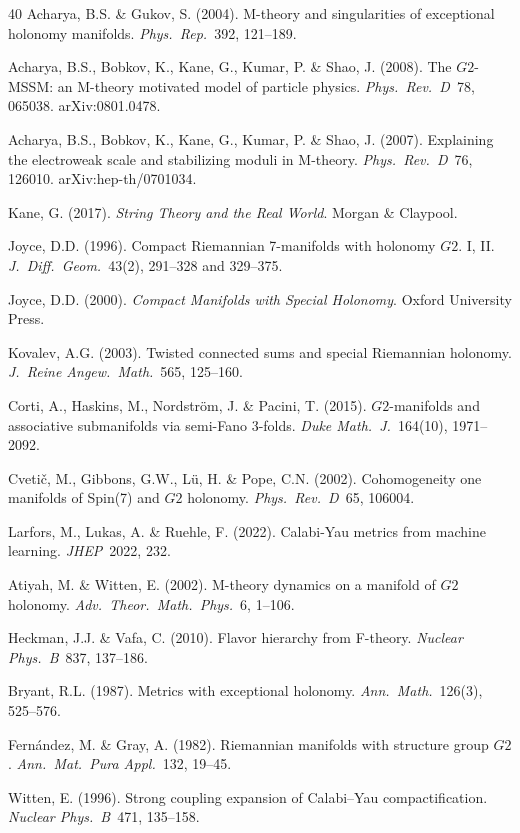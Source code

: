 \documentclass[11pt,a4paper]{article}
\newcommand{\Gtwo}{\mathrm{G}_2}
\theoremstyle{remark}
\def\Gtwo{G2}%
\begin{document}
\begin{thebibliography}{40}
Acharya, B.S. \& Gukov, S. (2004).
M-theory and singularities of exceptional holonomy manifolds.
\textit{Phys.\ Rep.}\ 392, 121--189.

Acharya, B.S., Bobkov, K., Kane, G., Kumar, P. \& Shao, J. (2008).
The $\Gtwo$-MSSM: an M-theory motivated model of particle physics.
\textit{Phys.\ Rev.\ D}\ 78, 065038. arXiv:0801.0478.

Acharya, B.S., Bobkov, K., Kane, G., Kumar, P. \& Shao, J. (2007).
Explaining the electroweak scale and stabilizing moduli in M-theory.
\textit{Phys.\ Rev.\ D}\ 76, 126010. arXiv:hep-th/0701034.

Kane, G. (2017).
\textit{String Theory and the Real World}.
Morgan \& Claypool.

Joyce, D.D. (1996).
Compact Riemannian 7-manifolds with holonomy $\Gtwo$. I, II.
\textit{J.\ Diff.\ Geom.}\ 43(2), 291--328 and 329--375.

Joyce, D.D. (2000).
\textit{Compact Manifolds with Special Holonomy}.
Oxford University Press.

Kovalev, A.G. (2003).
Twisted connected sums and special Riemannian holonomy.
\textit{J.\ Reine Angew.\ Math.}\ 565, 125--160.

Corti, A., Haskins, M., Nordstr\"om, J. \& Pacini, T. (2015).
$\Gtwo$-manifolds and associative submanifolds via semi-Fano 3-folds.
\textit{Duke Math.\ J.}\ 164(10), 1971--2092.

Cveti\v{c}, M., Gibbons, G.W., L\"u, H. \& Pope, C.N. (2002).
Cohomogeneity one manifolds of Spin(7) and $\Gtwo$ holonomy.
\textit{Phys.\ Rev.\ D}\ 65, 106004.

Larfors, M., Lukas, A. \& Ruehle, F. (2022).
Calabi-Yau metrics from machine learning.
\textit{JHEP}\ 2022, 232.

Atiyah, M. \& Witten, E. (2002).
M-theory dynamics on a manifold of $\Gtwo$ holonomy.
\textit{Adv.\ Theor.\ Math.\ Phys.}\ 6, 1--106.

Heckman, J.J. \& Vafa, C. (2010).
Flavor hierarchy from F-theory.
\textit{Nuclear Phys.\ B}\ 837, 137--186.

Bryant, R.L. (1987).
Metrics with exceptional holonomy.
\textit{Ann.\ Math.}\ 126(3), 525--576.

Fern\'andez, M. \& Gray, A. (1982).
Riemannian manifolds with structure group $\Gtwo$.
\textit{Ann.\ Mat.\ Pura Appl.}\ 132, 19--45.

Witten, E. (1996).
Strong coupling expansion of Calabi--Yau compactification.
\textit{Nuclear Phys.\ B}\ 471, 135--158.

\end{thebibliography}
\end{document}
